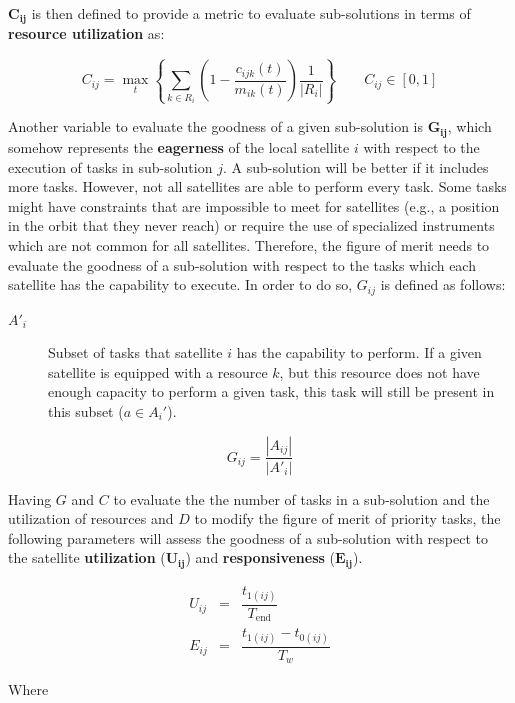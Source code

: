 $\mathbf{C_{ij}}$ is then defined to provide a metric to evaluate sub-solutions in terms of \textbf{resource utilization} as:

\begin{equation}
C_{ij} = \max_{t}\left\lbrace \sum_{k \in R_i}\left(1-\dfrac{c_{ijk}(t)}{m_{ik}(t)}\right)\dfrac{1}{|R_i|}\right\rbrace \qquad C_{ij} \in \left[0,1\right]
\end{equation}

Another variable to evaluate the goodness of a given sub-solution is $\mathbf{G_{ij}}$, which somehow represents the \textbf{eagerness} of the local satellite $i$ with respect to the execution of tasks in sub-solution $j$. A sub-solution will be better if it includes more tasks. However, not all satellites are able to perform every task. Some tasks might have constraints that are impossible to meet for satellites (e.g., a position in the orbit that they never reach) or require the use of specialized instruments which are not common for all satellites. Therefore, the figure of merit needs to evaluate the goodness of a sub-solution with respect to the tasks which each satellite has the capability to execute. In order to do so, $G_{ij}$ is defined as follows:
\begin{description}
\item[$A'_i$] Subset of tasks that satellite $i$ has the capability to perform. If a given satellite is equipped with a resource $k$, but this resource does not have enough capacity to perform a given task, this task will still be present in this subset ($a \in A_i'$).
\end{description}

\begin{equation}
G_{ij} = \dfrac{|A_{ij}|}{|A'_i|}
\end{equation}

Having $G$ and $C$ to evaluate the the number of tasks in a sub-solution and the utilization of resources and $D$ to modify the figure of merit of priority tasks, the following parameters will assess the goodness of a sub-solution with respect to the satellite \textbf{utilization} ($\mathbf{U_{ij}}$) and \textbf{responsiveness} ($\mathbf{E_{ij}}$). 

\begin{eqnarray}
U_{ij} &=& \dfrac{t_{1(ij)}}{T_\text{end}}\\
E_{ij} &=& \dfrac{t_{1(ij)}-t_{0(ij)}}{T_w}
\end{eqnarray}

Where

